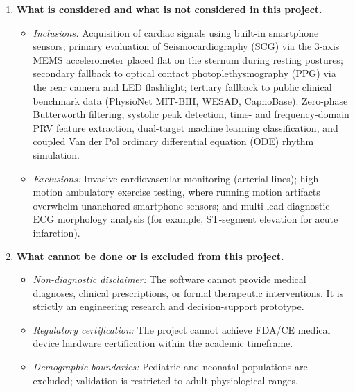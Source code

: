 \begin{enumerate}
	\item \textbf{What is considered and what is not considered in this project.}
	\begin{itemize}
		\item \textit{Inclusions:} Acquisition of cardiac signals using built-in
		smartphone sensors; primary evaluation of Seismocardiography (SCG)
		via the 3-axis MEMS accelerometer placed flat on the sternum during
		resting postures; secondary fallback to optical contact
		photoplethysmography (PPG) via the rear camera and LED flashlight;
		tertiary fallback to public clinical benchmark data (PhysioNet
		MIT-BIH, WESAD, CapnoBase). Zero-phase Butterworth filtering,
		systolic peak detection, time- and frequency-domain PRV feature
		extraction, dual-target machine learning classification, and
		coupled Van der Pol ordinary differential equation (ODE) rhythm
		simulation.
		\item \textit{Exclusions:} Invasive cardiovascular monitoring (arterial
		lines); high-motion ambulatory exercise testing, where running
		motion artifacts overwhelm unanchored smartphone sensors; and
		multi-lead diagnostic ECG morphology analysis (for example,
		ST-segment elevation for acute infarction).
	\end{itemize}
	
	\item \textbf{What cannot be done or is excluded from this project.}
	\begin{itemize}
		\item \textit{Non-diagnostic disclaimer:} The software cannot provide
		medical diagnoses, clinical prescriptions, or formal therapeutic
		interventions. It is strictly an engineering research and
		decision-support prototype.
		\item \textit{Regulatory certification:} The project cannot achieve
		FDA/CE medical device hardware certification within the academic
		timeframe.
		\item \textit{Demographic boundaries:} Pediatric and neonatal
		populations are excluded; validation is restricted to adult
		physiological ranges.
	\end{itemize}
	

\end{enumerate}
